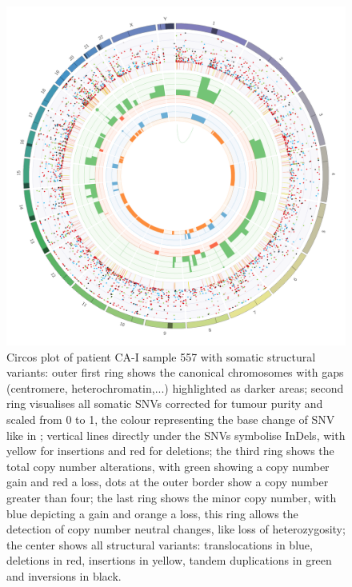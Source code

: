\begin{figure}[p]
\centering
\includegraphics[width=.99\linewidth]{Figures/CASCADE/CA51/CA51-557.circos.png}
\caption[Circos plot of patient CA-I sample 557]{Circos plot of patient CA-I sample 557 with somatic structural variants: outer first ring shows the canonical chromosomes with gaps (centromere, heterochromatin,...) highlighted as darker areas; second ring visualises all somatic SNVs corrected for tumour purity and scaled from 0 to 1, the colour representing the base change of SNV like in \protect\textcite{Alexandrov2013}; vertical lines directly under the SNVs symbolise InDels, with yellow for insertions and red for deletions; the third ring shows the total copy number alterations, with green showing a copy number gain and red a loss, dots at the outer border show a copy number greater than four; the last ring shows the minor copy number, with blue depicting a gain and orange a loss, this ring allows the detection of copy number neutral changes, like loss of heterozygosity; the center shows all structural variants: translocations in blue, deletions in red, insertions in yellow, tandem duplications in green and inversions in black.} \label{fig:ca51.557circos}
\end{figure}



